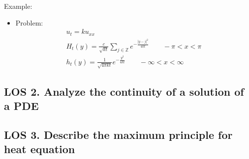 \documentclass[12pt, a4paper]{article}
\begin{document}
Example:
\begin{itemize}
    \item Problem:
    \begin{gather*}
        u_t = ku_{xx} \\
        H_t(y) = \frac{c}{\sqrt{kt}}\sum_{j\in\mathbb{Z}}e^{-\frac{|y-j|^2}{4kt}}\qquad -\pi < x < \pi \\
        h_t(y) = \frac{1}{\sqrt{4\pi kt}}e^{-\frac{y^2}{4kt}}\qquad -\infty < x < \infty 
    \end{gather*}
\end{itemize}
\vspace{0.3em}

\subsection*{LOS 2. Analyze the continuity of a solution of a PDE}
\vspace{0.3em}

\subsection*{LOS 3. Describe the maximum principle for heat equation}
\vspace{0.3em}
\end{document}
